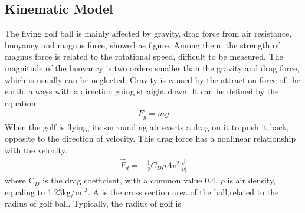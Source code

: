 \subsection{Kinematic Model}
The flying golf ball is mainly affected by gravity, drag force from air resistance, buoyancy and magnus force, showed as figure. Among them, the strength of magnus force is related to the rotational speed, difficult to be measured. The magnitude of the buoyancy is two orders smaller than the gravity and drag force, which is usually can be neglected.
Gravity is caused by the attraction force of the earth, always with a direction going straight down. It can be defined by the equation:
\begin{align}
F_{g}=m g
\end{align}
When the golf is flying, its surrounding air exerts a drag on it to push it back, opposite to the direction of velocity. This drag force has a nonlinear relationship with the velocity.
\begin{align}
\vec{F}_{d}=-\frac{1}{2} C_{D} \rho A v^{2} \frac{\vec{v}}{|v|}
\end{align}
where C$_D$ is the drag coefficient, with a common value 0.4. $\rho$ is air density, equaling to 1.23kg/m $^3$. A is the cross section area of the ball,related to the radius of golf ball. Typically, the radius of golf is


